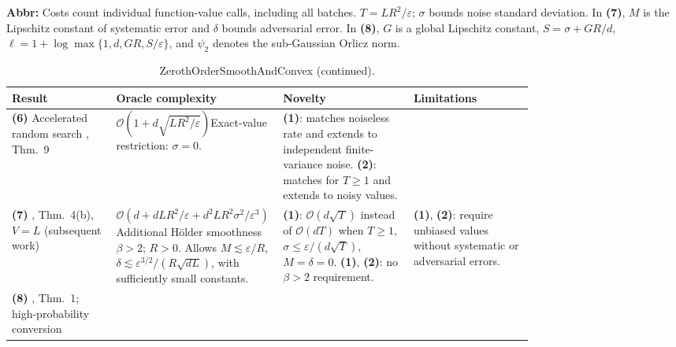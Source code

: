 \begin{table}[tp]
\begin{threeparttable}
\begin{tabularx}{\linewidth}{@{}>{\raggedright\arraybackslash}p{0.20\linewidth}>{\raggedright\arraybackslash}p{0.32\linewidth}>{\raggedright\arraybackslash}p{0.25\linewidth}>{\raggedright\arraybackslash}X@{}}
\bottomrule
\end{tabularx}
\begin{tablenotes}[flushleft]\footnotesize
\item[] \textbf{Abbr:} Costs count individual function-value calls, including all batches. $T=LR^2/\varepsilon$; $\sigma$ bounds noise standard deviation. In \textbf{(7)}, $M$ is the Lipschitz constant of systematic error and $\delta$ bounds adversarial error. In \textbf{(8)}, $G$ is a global Lipschitz constant, $S=\sigma+GR/d$, $\ell=1+\log\max\{1,d,GR,S/\varepsilon\}$, and $\psi_2$ denotes the sub-Gaussian Orlicz norm.
\end{tablenotes}
\end{threeparttable}
\end{table}
\clearpage
\begin{table}[tp]
\centering
\caption{ZerothOrderSmoothAndConvex (continued).}
\begin{threeparttable}
\footnotesize
\setlength{\tabcolsep}{4pt}\renewcommand{\arraystretch}{1.25}
\begin{tabularx}{\linewidth}{@{}>{\raggedright\arraybackslash}p{0.20\linewidth}>{\raggedright\arraybackslash}p{0.32\linewidth}>{\raggedright\arraybackslash}p{0.25\linewidth}>{\raggedright\arraybackslash}X@{}}
\toprule
\textbf{Result} & \textbf{Oracle complexity} & \textbf{Novelty} & \textbf{Limitations} \\
\midrule
\textbf{(6)} Accelerated random search \citep{zoscNesterovSpokoiny2017}, Thm.~9
& $\mathcal{O}(1+d\sqrt{LR^2/\varepsilon})$\newline Exact-value restriction: $\sigma=0$.
& \textbf{(1)}: matches noiseless rate and extends to independent finite-variance noise. \textbf{(2)}: matches for $T\ge1$ and extends to noisy values.
& \\
\midrule
\textbf{(7)} \citep{zoscLoginov2026v1}, Thm.~4(b), $V=L$ (subsequent work)
& $\mathcal{O}\!\left(d+dLR^2/\varepsilon+d^2LR^2\sigma^2/\varepsilon^3\right)$\newline Additional H\"older smoothness $\beta>2$; $R>0$. Allows $M\lesssim\varepsilon/R$, $\delta\lesssim\varepsilon^{3/2}/(R\sqrt{dL})$, with sufficiently small constants.
& \textbf{(1)}: $\mathcal{O}(d\sqrt T)$ instead of $\mathcal{O}(dT)$ when $T\ge1$, $\sigma\le\varepsilon/(d\sqrt T)$, $M=\delta=0$. \textbf{(1)}, \textbf{(2)}: no $\beta>2$ requirement.
& \textbf{(1)}, \textbf{(2)}: require unbiased values without systematic or adversarial errors.
\\
\midrule
\textbf{(8)} \citep{zoscLattimoreGyorgy2023v1}, Thm.~1; high-probability conversion

\end{tabularx}
\end{threeparttable}
\end{table}
